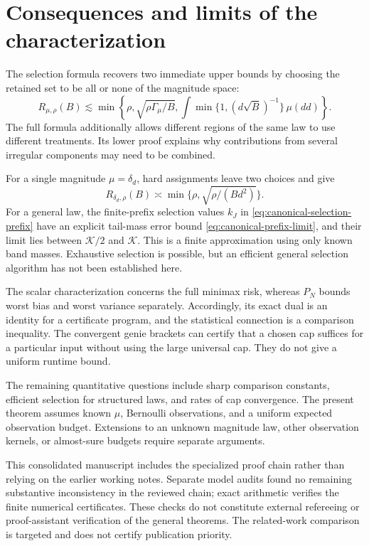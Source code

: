 \section{Consequences and limits of the characterization}\label{sec:discussion}

The selection formula recovers two immediate upper bounds by choosing
the retained set to be all or none of the magnitude space:
\[
 R_{\mu,\rho}(B)\lesssim
 \min\left\{\rho,\sqrt{\rho\Gamma_\mu/B},
 \int\min\{1,(d\sqrt B)^{-1}\}\,\mu(dd)\right\}.
\]
The full formula additionally allows different regions of the same law
to use different treatments. Its lower proof explains why contributions
from several irregular components may need to be combined.

For a single magnitude $\mu=\delta_d$, hard assignments leave two choices
and give
\[
 R_{\delta_d,\rho}(B)\asymp
       \min\{\rho,\sqrt{\rho/(Bd^2)}\}.
\]
For a general law, the finite-prefix selection values $k_J$ in
\eqref{eq:canonical-selection-prefix} have an explicit tail-mass error
bound \eqref{eq:canonical-prefix-limit}, and their limit lies between
$\mathcal K/2$ and $\mathcal K$. This is a finite approximation using only
known band masses. Exhaustive selection is possible, but an efficient
general selection algorithm has not been established here.

The scalar characterization concerns the full minimax risk, whereas
$P_N$ bounds worst bias and worst variance separately. Accordingly, its
exact dual is an identity for a certificate program, and the statistical
connection is a comparison inequality. The convergent genie brackets
can certify that a chosen cap suffices for a particular input without
using the large universal cap. They do not give a uniform runtime bound.

The remaining quantitative questions include sharp comparison constants,
efficient selection for structured laws, and rates of cap convergence.
The present theorem assumes known $\mu$, Bernoulli observations, and a
uniform expected observation budget. Extensions to an unknown magnitude
law, other observation kernels, or almost-sure budgets require separate
arguments.

This consolidated manuscript includes the specialized proof chain rather
than relying on the earlier working notes. Separate model audits found
no remaining substantive inconsistency in the reviewed chain; exact
arithmetic verifies the finite numerical certificates. These checks do
not constitute external refereeing or proof-assistant verification of the
general theorems. The related-work comparison is targeted and does not
certify publication priority.


